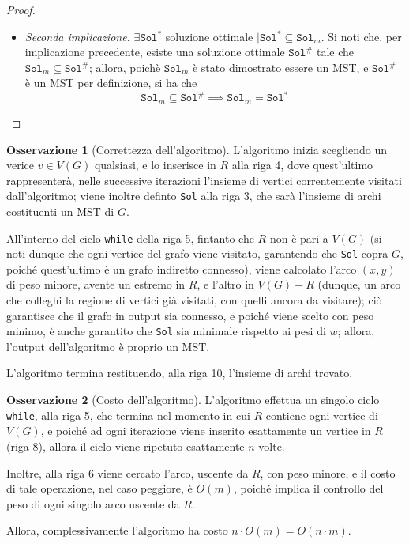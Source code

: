 \documentclass[14pt]{extreport}
\theoremstyle{definition}
\theoremstyle{definition}
\newtheorem{remark}{Osservazione}[subsection]
\begin{document}
\begin{proof}
\begin{itemize}
        \item[] \textit{Seconda implicazione.} $\exists \texttt{Sol}^*$ soluzione ottimale $\mid \texttt{Sol}^* \subseteq \texttt{Sol}_m$. Si noti che, per implicazione precedente, esiste una soluzione ottimale $\texttt{Sol}^\#$ tale che $\texttt{Sol}_m \subseteq \texttt{Sol}^\#$; allora, poichè $\texttt{Sol}_m$ è stato dimostrato essere un MST, e $\texttt{Sol}^\#$ è un MST per definizione, si ha che $$\texttt{Sol}_m \subseteq \texttt{Sol}^\# \implies \texttt{Sol}_m = \texttt{Sol}^*$$
    \end{itemize}
\end{proof}

\begin{remark}[Correttezza dell'algoritmo]
    L'algoritmo inizia scegliendo un verice $v \in V(G)$ qualsiasi, e lo inserisce in $R$ alla riga 4, dove quest'ultimo rappresenterà, nelle successive iterazioni l'insieme di vertici correntemente visitati dall'algoritmo; viene inoltre definto \texttt{Sol} alla riga 3, che sarà l'insieme di archi costituenti un MST di $G$.

    All'interno del ciclo \texttt{while} della riga 5, fintanto che $R$ non è pari a $V(G)$ (si noti dunque che ogni vertice del grafo viene visitato, garantendo che \texttt{Sol} copra $G$, poiché quest'ultimo è un grafo indiretto connesso), viene calcolato l'arco $(x, y)$ di peso minore, avente un estremo in $R$, e l'altro in $V(G) - R$ (dunque, un arco che colleghi la regione di vertici già visitati, con quelli ancora da visitare); ciò garantisce che il grafo in output sia connesso, e poiché viene scelto con peso minimo, è anche garantito che \texttt{Sol} sia minimale rispetto ai pesi di $w$; allora, l'output dell'algoritmo è proprio un MST.

    L'algoritmo termina restituendo, alla riga 10, l'insieme di archi trovato.
\end{remark}

\begin{remark}[Costo dell'algoritmo]
    L'algoritmo effettua un singolo ciclo \texttt{while}, alla riga 5, che termina nel momento in cui $R$ contiene ogni vertice di $V(G)$, e poiché ad ogni iterazione viene inserito esattamente un vertice in $R$ (riga 8), allora il ciclo viene ripetuto esattamente $n$ volte.

    Inoltre, alla riga 6 viene cercato l'arco, uscente da $R$, con peso minore, e il costo di tale operazione, nel caso peggiore, è $O(m)$, poiché implica il controllo del peso di ogni singolo arco uscente da $R$.

    Allora, complessivamente l'algoritmo ha costo $n \cdot O(m) = O(n \cdot m)$.
\end{remark}
\end{document}
